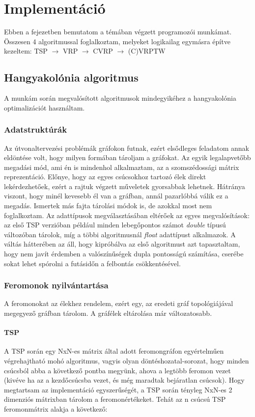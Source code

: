 \chapter{Implementáció} \label{implementationChapter}

Ebben a fejezetben bemutatom a témában végzett programozói munkámat. Összesen 4 algoritmussal foglalkoztam, melyeket logikailag egymásra építve kezeltem:
TSP  \(\rightarrow\) VRP \(\rightarrow\) CVRP \(\rightarrow\) (C)VRPTW

\section{Hangyakolónia algoritmus}
A munkám során megvalósított algoritmusok mindegyikéhez a hangyakolónia optimalizációt használtam.

\subsection{Adatstruktúrák}
Az útvonaltervezési problémák gráfokon futnak, ezért elsődleges feladatom annak eldöntése volt, hogy milyen formában tároljam a gráfokat. Az egyik legalapvetőbb megadási mód, ami én is mindenhol alkalmaztam, az a szomszédossági mátrix reprezentáció. Előnye, hogy az egyes csúcsokhoz tartozó élek direkt lekérdezhetőek, ezért a rajtuk végzett műveletek gyorsabbak lehetnek. Hátránya viszont, hogy minél kevesebb él van a gráfban, annál pazarlóbbá válik ez a megadás. Ismertek más fajta tárolási módok is, de azokkal most nem foglalkoztam. \cite{alg_optim}
Az adattípusok megválasztásában eltérőek az egyes megvalósítások: az első TSP verzióban például minden lebegőpontos számot \textit{double} típusú változóban tárolok, míg a többi algoritmusnál \textit{float} adattípust alkalmazok. A váltás hátterében az áll, hogy kipróbálva az első algoritmust azt tapasztaltam, hogy nem javít érdemben a valószínűségek dupla pontosságú számítása, cserébe sokat lehet spórolni a futásidőn a felbontás csökkentésével.


\subsection{Feromonok nyilvántartása}
A feromonokat az élekhez rendelem, ezért egy, az eredeti gráf topológiájával megegyező gráfban tárolom. A gráfélek eltárolása már változatosabb.

\subsubsection{TSP}
A TSP során egy NxN-es mátrix által adott feromongráfon egyértelműen végrehajtható mohó algoritmus, vagyis olyan döntéshozatal-sorozat, hogy minden csúcsból abba a következő pontba megyünk, ahova a legtöbb feromon vezet (kivéve ha az a kezdőcsúcsba vezet, és még maradtak bejáratlan csúcsok). Hogy megtartsam az implementáció egyszerűségét, a TSP során tényleg NxN-es 2 dimenziós mátrixban tárolom a feromonértékeket. Tehát az n csúcsú TSP feromonmátrix alakja a következő:

